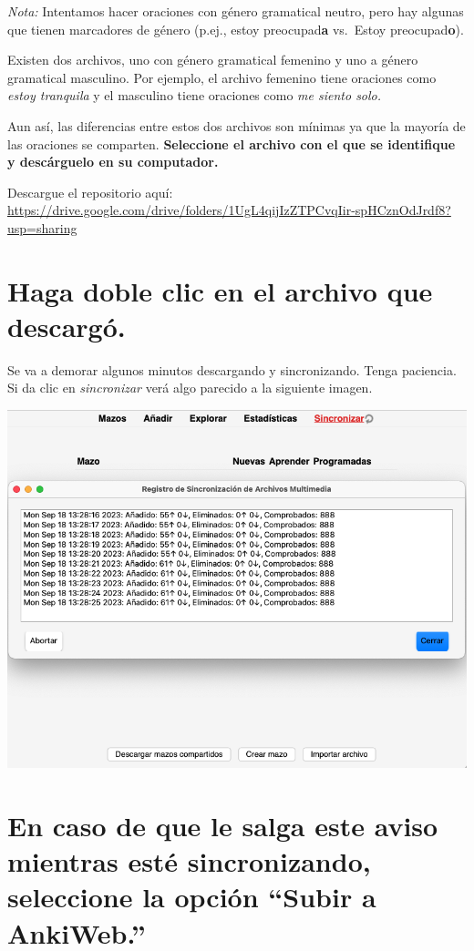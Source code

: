 \documentclass[
]{book}
\begin{document}
\emph{Nota:} Intentamos hacer oraciones con género gramatical neutro, pero hay algunas que tienen marcadores de género (p.ej., estoy preocupad\textbf{a} vs.~Estoy preocupad\textbf{o}).

Existen dos archivos, uno con género gramatical femenino y uno a género gramatical masculino. Por ejemplo, el archivo femenino tiene oraciones como \emph{estoy tranquila} y el masculino tiene oraciones como \emph{me siento solo.}

Aun así, las diferencias entre estos dos archivos son mínimas ya que la mayoría de las oraciones se comparten. \textbf{Seleccione el archivo con el que se identifique y descárguelo en su computador.}

Descargue el repositorio aquí: \url{https://drive.google.com/drive/folders/1UgL4qijIzZTPCvqIir-spHCznOdJrdf8?usp=sharing}

\hypertarget{haga-doble-clic-en-el-archivo-que-descarguxf3.}{%
\section{Haga doble clic en el archivo que descargó.}\label{haga-doble-clic-en-el-archivo-que-descarguxf3.}}

Se va a demorar algunos minutos descargando y sincronizando. Tenga paciencia. Si da clic en \emph{sincronizar} verá algo parecido a la siguiente imagen.

\includegraphics[width=1\linewidth]{images/reposit_sp/sincronizar}

\hypertarget{en-caso-de-que-le-salga-este-aviso-mientras-estuxe9-sincronizando-seleccione-la-opciuxf3n-subir-a-ankiweb.}{%
\section*{En caso de que le salga este aviso mientras esté sincronizando, seleccione la opción ``Subir a AnkiWeb.''}\label{en-caso-de-que-le-salga-este-aviso-mientras-estuxe9-sincronizando-seleccione-la-opciuxf3n-subir-a-ankiweb.}}
\end{document}
